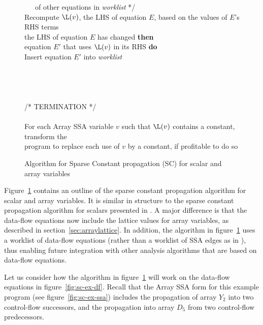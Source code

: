 \begin{figure}
\begin{center}
\begin{programa}
\Tb ~~~of other equations in {\it worklist} */ \\
\Tb Recompute $\L(v)$, the LHS of equation $E$, based on the values of $E$'s RHS terms\\
 the LHS of equation $E$ has changed {\bf then}\\
 equation $E'$ that uses $\L(v)$ in its RHS {\bf do}\\
\Td Insert equation $E'$ into {\it worklist}\\
\\
\\
 \\
\\
/* TERMINATION */\\
\\
\Ta For each Array SSA variable $v$ such that $\L(v)$ contains a constant, transform the \\ 
\Ta program to replace each use of $v$ by a constant, if profitable to do so
\end{programa}
\end{center}
\caption{Algorithm for Sparse Constant propagation (SC) for scalar and array variables}
\label{fig:sc-alg}
\end{figure}

Figure~\ref{fig:sc-alg} contains an outline of the sparse constant
propagation algorithm for scalar and array variables.  It is similar in
structure to the sparse constant propagation algorithm for scalars
presented in \cite{WeZa91}.  A major difference is that the data-flow
equations now include the lattice values for array variables, as
described in section~\ref{sec:arraylattice}.
In addition, the algorithm in figure~\ref{fig:sc-alg} uses a worklist
of data-flow equations (rather than a worklist of SSA edges as in \cite{WeZa91}), thus enabling future integration with other analysis algorithms that are
based on data-flow equations.

Let us consider how the algorithm in figure~\ref{fig:sc-alg}
will work on the data-flow equations in figure~\ref{fig:sc-ex-df}.
Recall that the Array SSA form for this example program 
(see figure~\ref{fig:sc-ex-ssa})
includes the propagation of array $Y_2$ into two control-flow successors, and the propagation into array $D_5$
from two control-flow
predecessors. 


